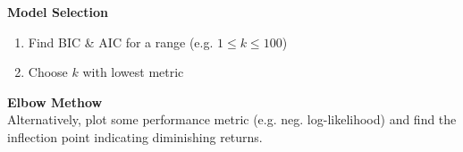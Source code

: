 \method \textbf{Model Selection}
\begin{enumerate}
    \item Find BIC \& AIC for a range (e.g. $1 \leq k \leq 100$) 
    \item Choose $k$ with lowest metric
\end{enumerate}

{\footnotesize
    \remark \textbf{Elbow Methow}\\
    Alternatively, plot some performance metric (e.g. neg. log-likelihood) and find the inflection point indicating diminishing returns.
}

